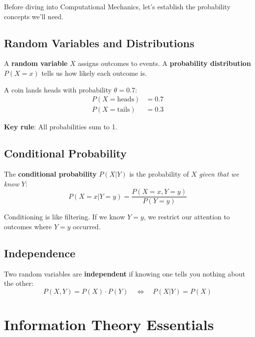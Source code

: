 \documentclass[11pt,a4paper]{article}
\theoremstyle{definition}
\theoremstyle{plain}
\begin{document}
Before diving into Computational Mechanics, let's establish the probability concepts we'll need.

\subsection{Random Variables and Distributions}

A \textbf{random variable} $X$ assigns outcomes to events. A \textbf{probability distribution} $P(X = x)$ tells us how likely each outcome is.

\begin{example}[title=Biased Coin]
A coin lands heads with probability $\theta = 0.7$:
\begin{align*}
    P(X = \text{heads}) &= 0.7 \\
    P(X = \text{tails}) &= 0.3
\end{align*}
\end{example}

\textbf{Key rule}: All probabilities sum to 1.

\subsection{Conditional Probability}

The \textbf{conditional probability} $P(X | Y)$ is the probability of $X$ \emph{given that we know} $Y$:
\begin{equation}
    P(X = x | Y = y) = \frac{P(X = x, Y = y)}{P(Y = y)}
\end{equation}

\begin{intuition}
Conditioning is like filtering. If we know $Y = y$, we restrict our attention to outcomes where $Y = y$ occurred.
\end{intuition}

\subsection{Independence}

Two random variables are \textbf{independent} if knowing one tells you nothing about the other:
\begin{equation}
    P(X, Y) = P(X) \cdot P(Y) \quad \Leftrightarrow \quad P(X|Y) = P(X)
\end{equation}

\section{Information Theory Essentials}
\label{sec:information-theory}
\end{document}
